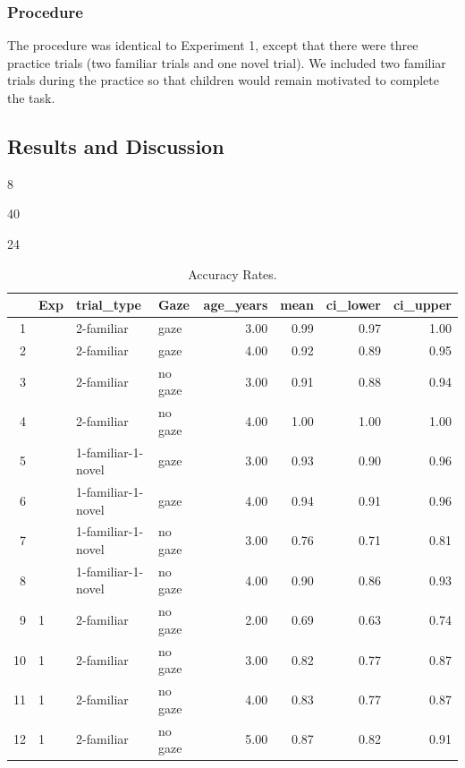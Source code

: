 \documentclass[10pt, letterpaper]{article}
\newenvironment{CodeChunk}{}{}
\begin{document}
\subsubsection{Procedure}\label{procedure-1}

The procedure was identical to Experiment 1, except that there were
three practice trials (two familiar trials and one novel trial). We
included two familiar trials during the practice so that children would
remain motivated to complete the task.

\subsection{Results and Discussion}\label{results-and-discussion-1}

\begin{CodeChunk}
\begin{CodeOutput}
[1] 8
\end{CodeOutput}
\begin{CodeOutput}
[1] 40
\end{CodeOutput}
\begin{CodeOutput}
[1] 24
\end{CodeOutput}
\end{CodeChunk}

\begin{table}[H]
\centering
\begin{tabular}{rlllrrrr}
  \hline
 & Exp & trial\_type & Gaze & age\_years & mean & ci\_lower & ci\_upper \\ 
  \hline
1 &  & 2-familiar & gaze & 3.00 & 0.99 & 0.97 & 1.00 \\ 
  2 &  & 2-familiar & gaze & 4.00 & 0.92 & 0.89 & 0.95 \\ 
  3 &  & 2-familiar & no gaze & 3.00 & 0.91 & 0.88 & 0.94 \\ 
  4 &  & 2-familiar & no gaze & 4.00 & 1.00 & 1.00 & 1.00 \\ 
  5 &  & 1-familiar-1-novel & gaze & 3.00 & 0.93 & 0.90 & 0.96 \\ 
  6 &  & 1-familiar-1-novel & gaze & 4.00 & 0.94 & 0.91 & 0.96 \\ 
  7 &  & 1-familiar-1-novel & no gaze & 3.00 & 0.76 & 0.71 & 0.81 \\ 
  8 &  & 1-familiar-1-novel & no gaze & 4.00 & 0.90 & 0.86 & 0.93 \\ 
  9 & 1 & 2-familiar & no gaze & 2.00 & 0.69 & 0.63 & 0.74 \\ 
  10 & 1 & 2-familiar & no gaze & 3.00 & 0.82 & 0.77 & 0.87 \\ 
  11 & 1 & 2-familiar & no gaze & 4.00 & 0.83 & 0.77 & 0.87 \\ 
  12 & 1 & 2-familiar & no gaze & 5.00 & 0.87 & 0.82 & 0.91 \\ 
   \hline
\end{tabular}
\caption{Accuracy Rates.} 
\end{table}
\end{document}
